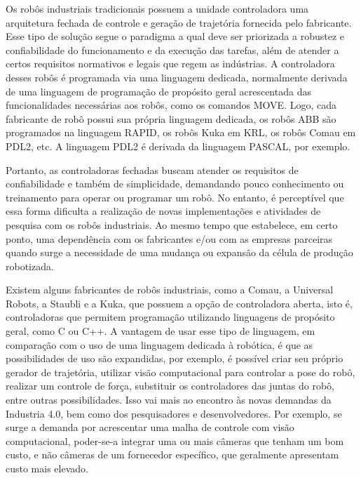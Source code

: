         Os robôs industriais tradicionais possuem a unidade controladora uma arquitetura fechada de controle e geração de trajetória fornecida pelo fabricante. Esse tipo de solução segue o paradigma a qual deve ser priorizada a robustez e confiabilidade do funcionamento e da execução das tarefas, além de atender a certos requisitos normativos e legais que regem as indústrias. A controladora desses robôs é programada via uma linguagem dedicada, normalmente derivada de uma linguagem de programação de propósito geral acrescentada das funcionalidades necessárias aos robôs, como os comandos MOVE. Logo, cada fabricante de robô possui sua própria linguagem dedicada, os robôs ABB são programados na linguagem RAPID, os robôs Kuka em KRL, os robôs Comau em PDL2, etc. A linguagem PDL2 é derivada da linguagem PASCAL, por exemplo.
        
        Portanto, as controladoras fechadas buscam atender os requisitos de confiabilidade e também de simplicidade, demandando pouco conhecimento ou treinamento para operar ou programar um robô. No entanto, é perceptível que essa forma dificulta a realização de novas implementações e atividades de pesquisa com os robôs industriais. Ao mesmo tempo que estabelece, em certo ponto, uma dependência com os fabricantes e/ou com as empresas parceiras quando surge a necessidade de uma mudança ou expansão da célula de produção robotizada.
        
        Existem alguns fabricantes de robôs industriais, como a Comau, a Universal Robots, a Staubli e a Kuka, que possuem a opção de controladora aberta, isto é, controladoras que permitem programação utilizando linguagens de propósito geral, como C ou C++. A vantagem de usar esse tipo de linguagem, em comparação com o uso de uma linguagem dedicada à robótica, é que as possibilidades de uso são expandidas, por exemplo, é possível criar seu próprio gerador de trajetória, utilizar visão computacional para controlar a pose do robô, realizar um controle de força, substituir os controladores das juntas do robô, entre outras possibilidades. Isso vai mais ao encontro às novas demandas da Industria 4.0, bem como dos pesquisadores e desenvolvedores. Por exemplo, se surge a demanda por acrescentar uma malha de controle com visão computacional, poder-se-a integrar uma ou mais câmeras que tenham um bom custo, e não câmeras de um fornecedor específico, que geralmente apresentam custo mais elevado.  
        
